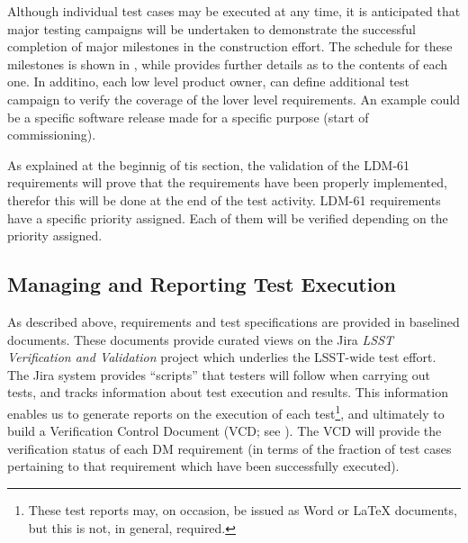 
Although individual test cases may be executed at any time, it is anticipated that major testing campaigns will be undertaken to demonstrate the successful completion of major milestones in the \product{} construction effort.
The schedule for these milestones is shown in , while  provides further details as to the contents of each one.
In additino, each low level product owner, can define additional test campaign to verify the coverage of the lover level requirements.
An example could be a specific software release made for a specific purpose (start of commissioning).

As explained at the beginnig of tis section, the validation of the LDM-61 requirements will prove that the \product{} requirements have been properly implemented, therefor this will be done at the end of the test activity.
LDM-61 requirements have a specific priority assigned. Each of them will be verified depending on the priority assigned.

\subsection{Managing and Reporting Test Execution}
\label{sect:reports}

As described above, requirements and test specifications are provided in baselined documents.
These documents provide curated views on the Jira \emph{LSST Verification and Validation} project which underlies the LSST-wide test effort.
The Jira system provides ``scripts'' that testers will follow when carrying out tests, and tracks information about test execution and results.
This information enables us to generate reports on the execution of each test\footnote{These test reports may, on occasion, be issued as Word or LaTeX documents, but this is not, in general, required.}, and ultimately to build a Verification Control Document (VCD; see ).
The VCD will provide the verification status of each DM requirement (in terms of the fraction of test cases pertaining to that requirement which have been successfully executed).

